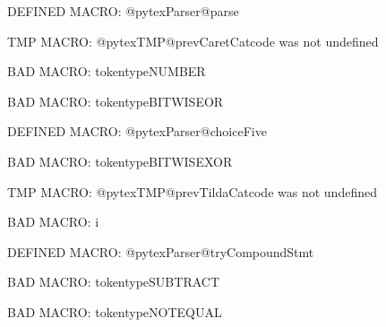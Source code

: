 \ifx\@pytexParser@parse\undefined\else DEFINED MACRO: @pytexParser@parse
\fi

\ifx\@pytexTMP@prevCaretCatcode\undefined\else TMP MACRO: @pytexTMP@prevCaretCatcode was not undefined
\fi

BAD MACRO: tokentypeNUMBER

BAD MACRO: tokentypeBITWISEOR

\ifx\@pytexParser@choiceFive\undefined\else DEFINED MACRO: @pytexParser@choiceFive
\fi

BAD MACRO: tokentypeBITWISEXOR

\ifx\@pytexTMP@prevTildaCatcode\undefined\else TMP MACRO: @pytexTMP@prevTildaCatcode was not undefined
\fi

BAD MACRO: i

\ifx\@pytexParser@tryCompoundStmt\undefined\else DEFINED MACRO: @pytexParser@tryCompoundStmt
\fi

BAD MACRO: tokentypeSUBTRACT

BAD MACRO: tokentypeNOTEQUAL

